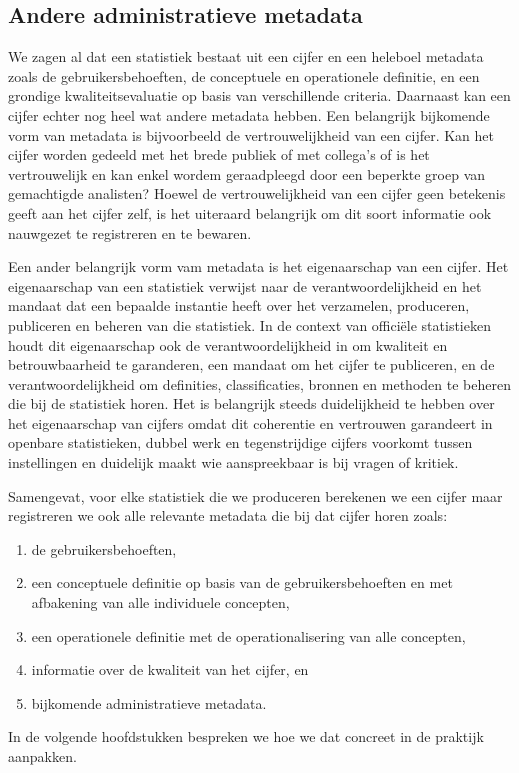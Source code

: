 \documentclass[\mainfiledir/00_handleiding_statistiekproductie.tex]{subfiles}
\begin{document}
	
\subsection{Andere administratieve metadata}
\label{sec:anderemetadata}

We zagen al dat een statistiek bestaat uit een cijfer en een heleboel metadata zoals de gebruikersbehoeften, de conceptuele en operationele definitie, en een grondige kwaliteitsevaluatie op basis van verschillende criteria. Daarnaast kan een cijfer echter nog heel wat andere metadata hebben. Een belangrijk bijkomende vorm van metadata is bijvoorbeeld de vertrouwelijkheid van een cijfer. Kan het cijfer worden gedeeld met het brede publiek of met collega's of is het vertrouwelijk en kan enkel wordem geraadpleegd door een beperkte groep van gemachtigde analisten? Hoewel de vertrouwelijkheid van een cijfer geen betekenis geeft aan het cijfer zelf, is het uiteraard belangrijk om dit soort informatie ook nauwgezet te registreren en te bewaren.

Een ander belangrijk vorm vam metadata is het eigenaarschap van een cijfer. Het eigenaarschap van een statistiek verwijst naar de verantwoordelijkheid en het mandaat dat een bepaalde instantie heeft over het verzamelen, produceren, publiceren en beheren van die statistiek. In de context van officiële statistieken houdt dit eigenaarschap ook de verantwoordelijkheid in om kwaliteit en betrouwbaarheid te garanderen, een mandaat om het cijfer te publiceren, en de verantwoordelijkheid om definities, classificaties, bronnen en methoden te beheren die bij de statistiek horen. Het is belangrijk steeds duidelijkheid te hebben over het eigenaarschap van cijfers omdat dit coherentie en vertrouwen garandeert in openbare statistieken, dubbel werk en tegenstrijdige cijfers voorkomt tussen instellingen en duidelijk maakt wie aanspreekbaar is bij vragen of kritiek.

Samengevat, voor elke statistiek die we produceren berekenen we een cijfer maar registreren we ook alle relevante metadata die bij dat cijfer horen zoals:
\begin{enumerate}[nosep]
	\item de gebruikersbehoeften,
	\item een conceptuele definitie op basis van de gebruikersbehoeften en met afbakening van alle individuele concepten,
	\item een operationele definitie met de operationalisering van alle concepten,
	\item informatie over de kwaliteit van het cijfer, en
	\item bijkomende administratieve metadata.
\end{enumerate}
In de volgende hoofdstukken bespreken we hoe we dat concreet in de praktijk aanpakken.
\end{document}
